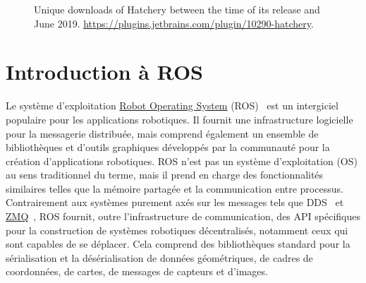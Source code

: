 \begin{figure}
    \centering
    \caption{Unique downloads of Hatchery between the time of its release and June 2019. \url{https://plugins.jetbrains.com/plugin/10290-hatchery}.}
    \label{fig:hatchery_downloads}
\end{figure}
%
\section{Introduction à ROS}

Le système d'exploitation \href{https://www.ros.org/}{Robot Operating System} (ROS)~\citep{quigley2009ros} est un intergiciel populaire pour les applications robotiques. Il fournit une infrastructure logicielle pour la messagerie distribuée, mais comprend également un ensemble de bibliothèques et d'outils graphiques développés par la communauté pour la création d'applications robotiques. ROS n'est pas un système d'exploitation (OS) au sens traditionnel du terme, mais il prend en charge des fonctionnalités similaires telles que la mémoire partagée et la communication entre processus. Contrairement aux systèmes purement axés sur les messages tels que DDS~\citep{pardo2003omg} et \href{https://zeromq.org/}{ZMQ}~\citep{hintjens2013zeromq}, ROS fournit, outre l'infrastructure de communication, des API spécifiques pour la construction de systèmes robotiques décentralisés, notamment ceux qui sont capables de se déplacer. Cela comprend des bibliothèques standard pour la sérialisation et la désérialisation de données géométriques, de cadres de coordonnées, de cartes, de messages de capteurs et d'images.

